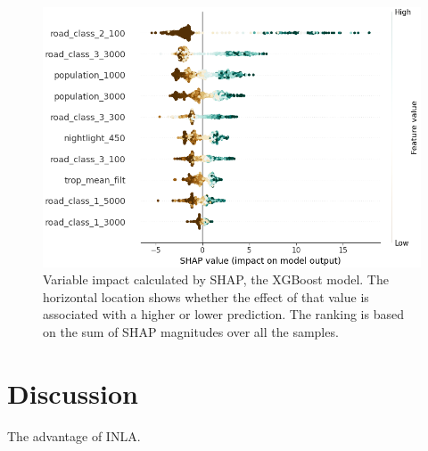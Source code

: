 \documentclass{article}
\begin{document}
\begin{figure}
\centering
\includegraphics[scale = 0.5]{fig/xgbshap.png}
\caption{Variable impact calculated by SHAP, the XGBoost model. The horizontal location shows whether the effect of that value is associated with a higher or lower prediction. The ranking is based on the sum of SHAP magnitudes over all the samples.}
\label{xgbshap}
\end{figure}

\section{Discussion}
The advantage of INLA.


\newpage



\end{document}
